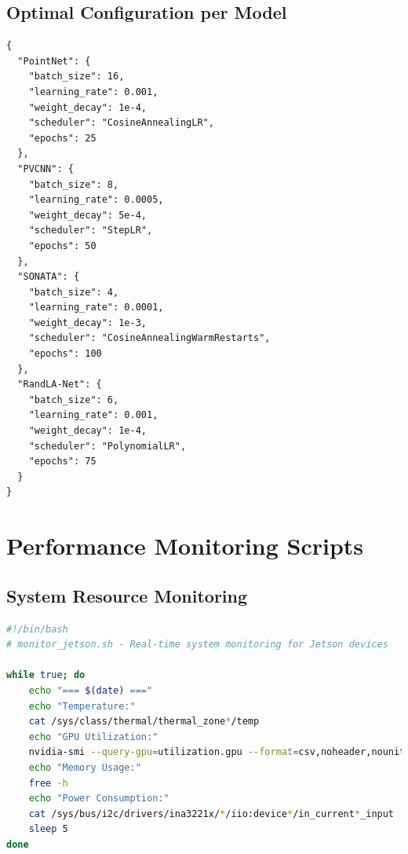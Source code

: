 \documentclass[12pt,a4paper]{report}
\begin{document}
\section{Optimal Configuration per Model}

\begin{lstlisting}[caption=Optimal Training Hyperparameters, label=lst:hyperparams]
{
  "PointNet": {
    "batch_size": 16,
    "learning_rate": 0.001,
    "weight_decay": 1e-4,
    "scheduler": "CosineAnnealingLR",
    "epochs": 25
  },
  "PVCNN": {
    "batch_size": 8,
    "learning_rate": 0.0005,
    "weight_decay": 5e-4,
    "scheduler": "StepLR",
    "epochs": 50
  },
  "SONATA": {
    "batch_size": 4,
    "learning_rate": 0.0001,
    "weight_decay": 1e-3,
    "scheduler": "CosineAnnealingWarmRestarts",
    "epochs": 100
  },
  "RandLA-Net": {
    "batch_size": 6,
    "learning_rate": 0.001,
    "weight_decay": 1e-4,
    "scheduler": "PolynomialLR",
    "epochs": 75
  }
}
\end{lstlisting}

\chapter{Performance Monitoring Scripts}

\section{System Resource Monitoring}

\begin{lstlisting}[caption=Jetson Resource Monitoring Script, label=lst:monitoring, language=bash]
#!/bin/bash
# monitor_jetson.sh - Real-time system monitoring for Jetson devices

while true; do
    echo "=== $(date) ==="
    echo "Temperature:"
    cat /sys/class/thermal/thermal_zone*/temp
    echo "GPU Utilization:"
    nvidia-smi --query-gpu=utilization.gpu --format=csv,noheader,nounits
    echo "Memory Usage:"
    free -h
    echo "Power Consumption:"
    cat /sys/bus/i2c/drivers/ina3221x/*/iio:device*/in_current*_input
    sleep 5
done
\end{lstlisting}
\end{document}
